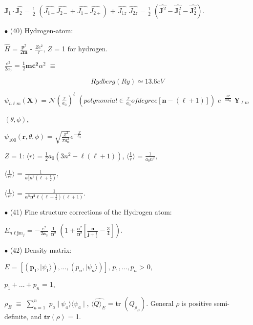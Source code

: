 \documentclass[a4paper, 10pt, onepage]{elegantbook}
\begin{document}
{$\hat{\mathbf J_1} \cdot \hat{\mathbf J_2}$ = $\frac{1}{2}$ $( \hat{\mathit J_{1 +}} \hat{\mathit J_{2 -}} + 
\hat{\mathit J_{1 -}} \hat{\mathit J_{2 +}})$ + $ \hat{\mathit J_{1z}}$ $\hat{\mathit J_{2z}}$ = $ \frac{1}{2}$ 
$(\hat{\mathbf J^2} - \hat{\mathbf J^2_1} - \hat{\mathbf J^2_2})$. 

$\bullet$ (40) Hydrogen-atom:  

$\hat{H}$ = $ \frac{\hat{\mathbf p^2}} {2 {\mathbf m}}$ - $ \frac{\mathit Z e^2}{r}$, $ \mathit Z$ = 1 $\text{for 
hydrogen.}$  

$\frac{e^2}{2a_0}$ = $ \frac{1}{2} \mathbf {mc^2} \alpha^2$ $ \equiv$

\label{eq:Rydberg}
\begin{equation}
Rydberg(Ry)  \simeq 13.6 eV
\end{equation}

\noindent

$\psi_{n \ell m} (\mathbf X)$ = $\mathcal N ( \frac{r}{a_0})^\ell$ $ ( polynomial \in {\frac{r}{a_0}} of degree 
[{\mathbf {n} - (\ell + 1)}])$ $ e^{- \frac{\mathit Zr} {\mathbf {n a_0}}}$ $\mathbf Y_{\ell m}$  

 $(\theta, \phi)$, 

$\psi_{100} ( \mathbf r, \theta, \phi)$ = ${\sqrt{\frac{\mathit{Z^3}}{\pi {a^3_0}}}} e^{- \frac{ \mathit{Z}}{a_0}}$ 

$\mathit Z$ = 1: $ \langle r \rangle$ = $ \frac{1}{2} a_0(3n^2 - \ell(\ell + 1))$, $ \langle \frac{1}{r} \rangle$ = 
$\frac{1}{a_0 n^2}$,  

$\langle \frac{1}{r^2} \rangle$ = $ \frac{1}{a^2_0 n^3 (\ell + \frac{1}{2})}$, 

$ \langle \frac{1}{r^3} \rangle$ = $ \frac{1}{\mathbf {a^3 n^3} \ell (\ell + \frac{1}{2}) (\ell + 1)}$.  

$\bullet$ (41) Fine structure corrections of the Hydrogen atom:  

$\mathit E_{n \ell {\mathbf j m_j}}$ = $ - \frac{e^2}{2 \mathbf a_0}$ $ \frac{1}{\mathbf n^2}$ $ (1 + 
\frac{\alpha^2}{\mathbf n^2} [\frac{\mathbf n}{\mathbf j + \frac{1}{2}} - \frac{3}{4}])$.  

$\bullet$ (42) Density matrix: 
 
$\mathit E$ = $[ (\mathbf p_1, \mid \psi_1 \rangle), ..., ( \mathit p_n, \mid \psi_n \rangle)]$,
$\mathit p_1,...,\mathit p_n$ > 0, 

$p_1 +...+ p_n$ = 1,  
   
$\rho_\mathit E$ $\equiv$ $\sum_{a = 1}^n$ $\mathit p_a \mid \psi_a \rangle \langle \psi_a \mid$,
$\langle \hat{\mathit Q \rangle_\mathit E}$ = tr $ (\mathit Q_{\rho_{\mathit E}})$.
General $\rho$ is positive semi-definite, and $\mathbf{tr}(\rho)$ = 1. 

}
\end{document}
